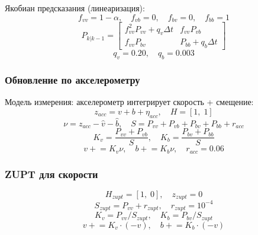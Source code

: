 \documentclass[12pt, a4paper]{article}
\begin{document}
Якобиан предсказания (линеаризация):
\begin{equation}
  f_{vv} = 1 - \alpha, \quad f_{vb} = 0, \quad f_{bv} = 0, \quad f_{bb} = 1
\end{equation}
\begin{equation}
  P_{k|k-1} =
  \begin{bmatrix} f_{vv}^2 P_{vv} + q_v\Delta t & f_{vv}P_{vb} \\
                  f_{vv}P_{bv}                   & P_{bb} + q_b\Delta t \end{bmatrix}
\end{equation}
\begin{equation}
  q_v = 0.20, \quad q_b = 0.003
\end{equation}

\subsubsection{Обновление по акселерометру}
Модель измерения: акселерометр интегрирует скорость + смещение:
\begin{equation}
  z_{acc} = v + b + \eta_{acc}, \quad H = [1,\; 1]
\end{equation}
\begin{equation}
  \nu = z_{acc} - \hat{v} - \hat{b}, \quad
  S = P_{vv} + P_{vb} + P_{bv} + P_{bb} + r_{acc}
\end{equation}
\begin{equation}
  K_v = \frac{P_{vv} + P_{vb}}{S}, \quad K_b = \frac{P_{bv} + P_{bb}}{S}
\end{equation}
\begin{equation}
  v \mathrel{+}= K_v\nu, \quad b \mathrel{+}= K_b\nu, \quad r_{acc} = 0.06
\end{equation}

\subsubsection{ZUPT для скорости}
\begin{equation}
  H_{zupt} = [1,\; 0], \quad z_{zupt} = 0
\end{equation}
\begin{equation}
  S_{zupt} = P_{vv} + r_{zupt},\quad r_{zupt} = 10^{-4}
\end{equation}
\begin{equation}
  K_v = P_{vv}/S_{zupt}, \quad K_b = P_{bv}/S_{zupt}
\end{equation}
\begin{equation}
  v \mathrel{+}= K_v\cdot(-v), \quad b \mathrel{+}= K_b\cdot(-v)
\end{equation}
\end{document}
